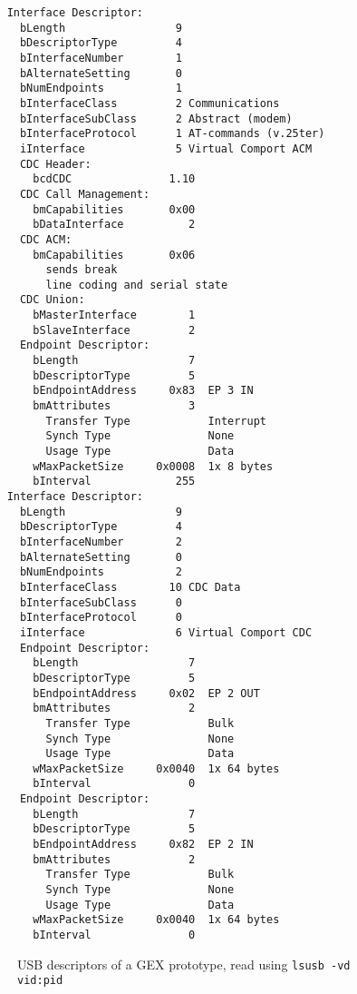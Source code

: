 \begin{minipage}[t]{0.5\textwidth}\scriptsize
\begin{verbatim}
    Interface Descriptor:
      bLength                 9
      bDescriptorType         4
      bInterfaceNumber        1
      bAlternateSetting       0
      bNumEndpoints           1
      bInterfaceClass         2 Communications
      bInterfaceSubClass      2 Abstract (modem)
      bInterfaceProtocol      1 AT-commands (v.25ter)
      iInterface              5 Virtual Comport ACM
      CDC Header:
        bcdCDC               1.10
      CDC Call Management:
        bmCapabilities       0x00
        bDataInterface          2
      CDC ACM:
        bmCapabilities       0x06
          sends break
          line coding and serial state
      CDC Union:
        bMasterInterface        1
        bSlaveInterface         2 
      Endpoint Descriptor:
        bLength                 7
        bDescriptorType         5
        bEndpointAddress     0x83  EP 3 IN
        bmAttributes            3
          Transfer Type            Interrupt
          Synch Type               None
          Usage Type               Data
        wMaxPacketSize     0x0008  1x 8 bytes
        bInterval             255
    Interface Descriptor:
      bLength                 9
      bDescriptorType         4
      bInterfaceNumber        2
      bAlternateSetting       0
      bNumEndpoints           2
      bInterfaceClass        10 CDC Data
      bInterfaceSubClass      0 
      bInterfaceProtocol      0 
      iInterface              6 Virtual Comport CDC
      Endpoint Descriptor:
        bLength                 7
        bDescriptorType         5
        bEndpointAddress     0x02  EP 2 OUT
        bmAttributes            2
          Transfer Type            Bulk
          Synch Type               None
          Usage Type               Data
        wMaxPacketSize     0x0040  1x 64 bytes
        bInterval               0
      Endpoint Descriptor:
        bLength                 7
        bDescriptorType         5
        bEndpointAddress     0x82  EP 2 IN
        bmAttributes            2
          Transfer Type            Bulk
          Synch Type               None
          Usage Type               Data
        wMaxPacketSize     0x0040  1x 64 bytes
        bInterval               0
\end{verbatim}
\end{minipage}\vspace{-1em}
\begin{figure}[H]
	\cprotect\caption{USB descriptors of a GEX prototype, read using \verb|lsusb -vd vid:pid|}
\end{figure}
